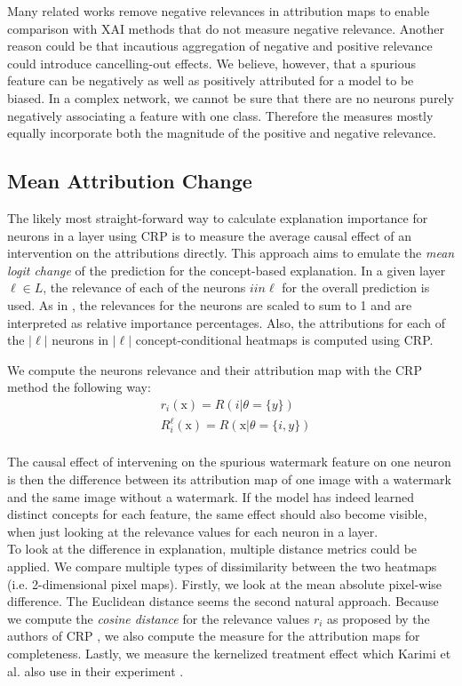 Many related works remove negative relevances in attribution maps to enable comparison with XAI methods that do not measure negative relevance. Another reason could be that incautious aggregation of negative and positive relevance could introduce cancelling-out effects. We believe, however, that a spurious feature can be negatively as well as positively attributed for a model to be biased. In a complex network, we cannot be sure that there are no neurons purely negatively associating a feature with one class. Therefore the measures mostly equally incorporate both the magnitude of the positive and negative relevance. 


\subsection{Mean Attribution Change}
The likely most straight-forward way to calculate explanation importance for neurons in a layer using CRP is to measure the average causal effect of an intervention on the attributions directly. This approach aims to emulate the \textit{mean logit change} of the prediction for the concept-based explanation. In a given layer $\ell \in L$, the relevance of each of the neurons $i in \ell$ for the overall prediction is used. As in \cite{Achtibat2022}, the relevances for the neurons are scaled to sum to 1 and are interpreted as relative importance percentages.
Also, the attributions for each of the $|\ell|$ neurons in $|\ell|$ concept-conditional heatmaps is computed using CRP.

We compute the neurons relevance and their attribution map with the CRP method the following way:
\begin{align*}
& r_i(\mathrm{x}) = R(i | \theta=\{y\}) \\
& R_i^{\ell}(\mathrm{x}) = R(\mathrm{x} | \theta=\{i, y\}) \\
\end{align*}

The causal effect of intervening on the spurious watermark feature on one neuron is then the difference between its attribution map of one image with a watermark and the same image without a watermark. If the model has indeed learned distinct concepts for each feature, the same effect should also become visible, when just looking at the relevance values for each neuron in a layer.\\

To look at the difference in explanation, multiple distance metrics could be applied. We compare multiple types of dissimilarity between the two heatmaps (i.e. 2-dimensional pixel maps). Firstly, we look at the mean absolute pixel-wise difference. The Euclidean distance seems the second natural approach. Because we compute the \textit{cosine distance} for the relevance values $r_i$ as proposed by the authors of CRP \cite{Achtibat2023}, we also compute the measure for the attribution maps for completeness.
Lastly, we measure the kernelized treatment effect which Karimi et al. also use in their experiment \cite{Karimi2023}. \\ 

